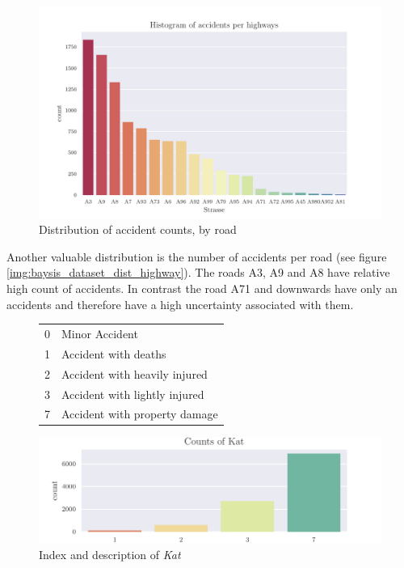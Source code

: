 \begin{figure}[ht]
	\centering
	\includegraphics[scale=0.75]{CorrAnalysis/data/BAYSIS/01_dataset/plots/baysis_dataset_hist_highway}
	\caption{Distribution of accident counts, by road}
	\label{img:baysis_dataset_dist_highway}
\end{figure}

Another valuable distribution is the number of accidents per road (see figure \autoref{img:baysis_dataset_dist_highway}). The roads A3, A9 and A8 have relative high count of accidents. In contrast the road A71 and downwards have only an accidents and therefore have a high uncertainty associated with them. 

\begin{figure}[!ht]
	\centering
	\begin{minipage}[t]{.4\textwidth} 
		\centering 	
		\begin{tabular}{c|l}  
			0 & Minor Accident  \\
			1 & Accident with deaths  \\ 
			2 & Accident with heavily injured  \\
			3 & Accident with lightly injured  \\
			7 & Accident with property damage  \\
	   	\end{tabular}
	\end{minipage}
	\begin{minipage}[t]{.5\textwidth} 
		\centering
		\vspace{0pt}
		\includegraphics[scale=1.0]{CorrAnalysis/data/BAYSIS/01_dataset/plots/baysis_dataset_count_Kat}
	\end{minipage} 
	\caption{Index and description of \textit{Kat}}
	\label{table:baysis_dataset_Kat}
	\label{img:baysis_dataset_Kat}
\end{figure} 

